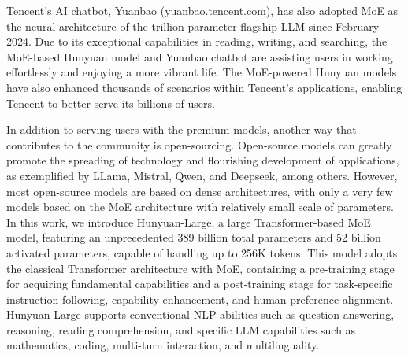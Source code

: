 \documentclass{article}
\begin{document}
Tencent's AI chatbot, Yuanbao (yuanbao.tencent.com), has also adopted MoE as the neural architecture of the trillion-parameter flagship LLM since February 2024. Due to its exceptional capabilities in reading, writing, and searching, the MoE-based Hunyuan model and Yuanbao chatbot are assisting users in working effortlessly and enjoying a more vibrant life. The MoE-powered Hunyuan models have also enhanced thousands of scenarios within Tencent's applications, enabling Tencent to better serve its billions of users. 

In addition to serving users with the premium models, another way that contributes to the community is open-sourcing. Open-source models can greatly promote the spreading of technology and flourishing development of applications, as exemplified by LLama, Mistral, Qwen, and Deepseek, among others. However, most open-source models are based on dense architectures, with only a very few models based on the MoE architecture with relatively small scale of parameters. In this work, we introduce Hunyuan-Large, a large Transformer-based MoE model, featuring an unprecedented 389 billion total parameters and 52 billion activated parameters, capable of handling up to 256K tokens. This model adopts the classical Transformer architecture \citep{vaswani2017attention} with MoE, containing a pre-training stage for acquiring fundamental capabilities and a post-training stage for task-specific instruction following, capability enhancement, and human preference alignment.
Hunyuan-Large supports conventional NLP abilities such as question answering, reasoning, reading comprehension, and specific LLM capabilities such as mathematics, coding, multi-turn interaction, and multilinguality.
\end{document}

